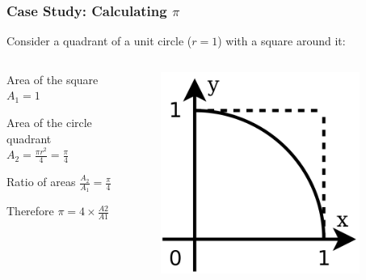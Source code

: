 \documentclass[14pt]{beamer}
\begin{document}
\begin{frame}
\frametitle{Case Study: Calculating $\pi$}
Consider a quadrant of a unit circle ($r=1$) with a square around it:
\begin{columns}
\begin{column}{0.5\textwidth}
\begin{itemize}
\small{
\item Area of the square $A_1 = 1$\\
\item Area of the circle quadrant $A_2 =\frac{\pi r^2}{4} = \frac{\pi}{4}$ \\
\item Ratio of areas $\frac{A_2}{A_1} = \frac{\pi}{4}$
\item Therefore $\pi = 4\times \frac{A2}{A1}$
}
\end{itemize}
\end{column}
\begin{column}{0.5\textwidth}
\begin{figure}
\includegraphics[width=0.9\textwidth]{pi.png}
\end{figure}
\end{column}
\end{columns}
\end{frame}
\end{document}
